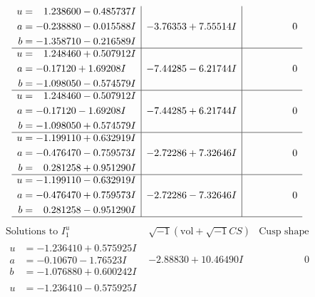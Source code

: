 \documentclass[1p]{elsarticle_modified}
\theoremstyle{definition}
\newcommand{\I}{\sqrt{-1}}
\begin{document}
$$\begin{array}{c|c|c}
\begin{aligned}
u &= \phantom{-}1.238600 - 0.485737 I \\
a &= -0.238880 - 0.015588 I \\
b &= -1.358710 - 0.216589 I\end{aligned}
 & -3.76353 + 7.55514 I & \phantom{-0.000000 } 0 \\ \hline\begin{aligned}
u &= \phantom{-}1.248460 + 0.507912 I \\
a &= -0.17120 + 1.69208 I \\
b &= -1.098050 - 0.574579 I\end{aligned}
 & -7.44285 - 6.21744 I & \phantom{-0.000000 } 0 \\ \hline\begin{aligned}
u &= \phantom{-}1.248460 - 0.507912 I \\
a &= -0.17120 - 1.69208 I \\
b &= -1.098050 + 0.574579 I\end{aligned}
 & -7.44285 + 6.21744 I & \phantom{-0.000000 } 0 \\ \hline\begin{aligned}
u &= -1.199110 + 0.632919 I \\
a &= -0.476470 - 0.759573 I \\
b &= \phantom{-}0.281258 + 0.951290 I\end{aligned}
 & -2.72286 + 7.32646 I & \phantom{-0.000000 } 0 \\ \hline\begin{aligned}
u &= -1.199110 - 0.632919 I \\
a &= -0.476470 + 0.759573 I \\
b &= \phantom{-}0.281258 - 0.951290 I\end{aligned}
 & -2.72286 - 7.32646 I & \phantom{-0.000000 } 0\\
 \hline 
 \end{array}$$\newpage$$\begin{array}{c|c|c}  
\text{Solutions to }I^u_{1}& \I (\text{vol} + \sqrt{-1}CS) & \text{Cusp shape}\\
 \hline 
\begin{aligned}
u &= -1.236410 + 0.575925 I \\
a &= -0.10670 - 1.76523 I \\
b &= -1.076880 + 0.600242 I\end{aligned}
 & -2.88830 + 10.46490 I & \phantom{-0.000000 } 0 \\ \hline\begin{aligned}
u &= -1.236410 - 0.575925 I \\

\end{aligned}
\end{array}$$
\end{document}
